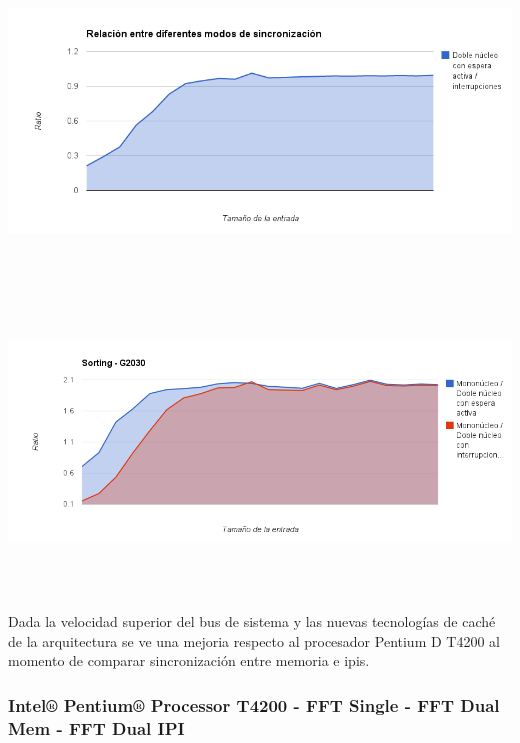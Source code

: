 \begin{center}
	    \includegraphics[height=8cm]{images/memory_ipis_g2030_sortipi.png}
	\end{center}


\begin{center}
	    \includegraphics[height=8cm]{images/sort_ipis_g2030.png}
	\end{center}


Dada la velocidad superior del bus de sistema y las nuevas tecnologías de caché de la arquitectura se ve una mejoria respecto al procesador Pentium D T4200 al momento de comparar sincronización entre memoria e ipis. 

\subsubsection{Intel® Pentium® Processor T4200 - FFT Single - FFT Dual Mem - FFT Dual IPI}

